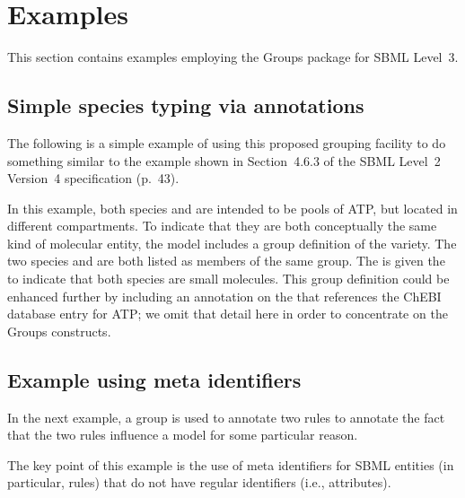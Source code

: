 
\section{Examples}
\label{examples}

This section contains examples employing the Groups package for SBML Level~3.

\subsection{Simple species typing via annotations}
\label{examples-speciestype}

The following is a simple example of using this proposed grouping facility to do something similar to the \SpeciesType example shown in Section~4.6.3 of the SBML Level~2 Version~4 specification (p.~43).

%


In this example, both species  and  are intended to be pools of ATP, but located in different compartments.  To indicate that they are both conceptually the same kind of molecular entity, the model includes a group definition of the  variety.  The two species  and  are both listed as members of the same group.  The \ListOfMembers is given the   to indicate that both species are small molecules.
This group definition could be enhanced further by including an annotation on the \ListOfMembers that references the ChEBI database entry for ATP; we omit that detail here in order to concentrate on the Groups constructs.


\subsection{Example using meta identifiers}

In the next example, a group is used to annotate two rules to annotate the fact that the two rules influence a model for some particular reason.

\clearpage


The key point of this example is the use of meta identifiers for SBML entities (in particular, rules) that do not have regular identifiers (i.e.,  attributes).
